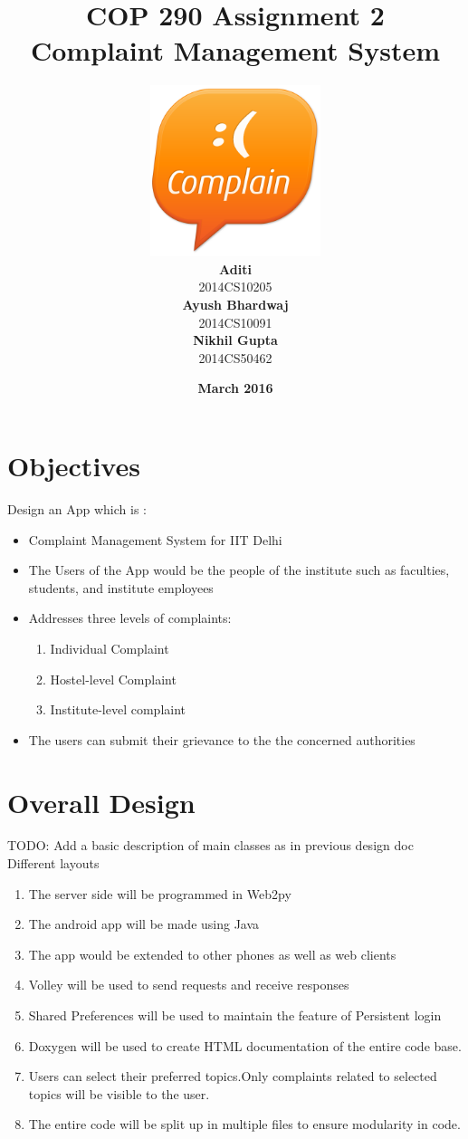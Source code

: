 \documentclass{article}
\title{\vspace*{\fill} \textbf{COP 290 Assignment 2}
	  \\ {\Large \textbf{Complaint Management System}}
}
\author{
	\vspace{5mm} \includegraphics[width=5cm]{logo.png} \\
	 \textbf{Aditi}\\
	2014CS10205 \vspace{2mm} \\
	\textbf{Ayush Bhardwaj}\\ 
	2014CS10091 \vspace{2mm} \\
	\textbf{Nikhil Gupta}\\ 
	2014CS50462 \vspace{2mm}
}
\date{\vspace{3mm} \textbf{March 2016} \vspace*{\fill}}
\begin{document}
	\maketitle

	\newpage

	\tableofcontents

	\newpage

	\section{Objectives}
		Design an App which is :
		\begin{itemize} 
			\item Complaint Management System for IIT Delhi
			\item The Users of the App would be the people of the institute such as faculties, students, and institute employees
			\item Addresses three levels of complaints: 
				\begin{enumerate}
					\item Individual Complaint 
					\item Hostel-level Complaint
					\item Institute-level complaint
				\end{enumerate}
			\item The users can submit their grievance to the the concerned authorities
		\end{itemize}
	\section{Overall Design}
		TODO:  Add a basic description of main classes as in previous design doc 
		Different layouts
		\begin{enumerate}
			\item The server side will be programmed in Web2py ~\cite{Web2py_Basics}
			\item The android app will be made using Java
			\item The app would be extended to other phones as well as web clients
			\item Volley will be used to send requests and receive responses
			\item Shared Preferences will be used to maintain the feature of Persistent login 
			\item Doxygen will be used to create HTML documentation of the entire code base.
			\item Users can select their preferred topics.Only complaints related to selected topics will be visible to the user.
			\item The entire code will be split up in multiple files to ensure modularity in code.
		\end{enumerate}
\end{document}
